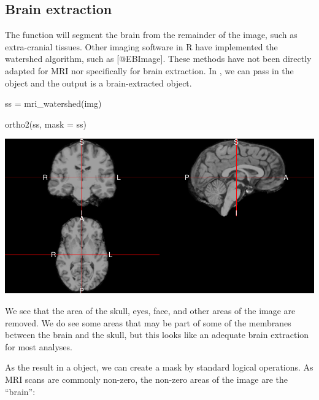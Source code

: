 \subsection{Brain extraction}\label{brain-extraction}

The  function will segment the brain from the
remainder of the image, such as extra-cranial tissues. Other imaging
software in R have implemented the watershed algorithm, such as
 {[}@EBImage{]}. These methods have not been directly
adapted for MRI nor specifically for brain extraction. In
, we can pass in the  object and the output
is a brain-extracted  object.

\begin{Schunk}
\begin{Sinput}
ss = mri_watershed(img)
\end{Sinput}
\end{Schunk}

\begin{Schunk}
\begin{Sinput}
ortho2(ss, mask = ss)
\end{Sinput}
\end{Schunk}\begin{Schunk}

\includegraphics{Freesurfer_files/figure-latex/watershed_plot-1} \end{Schunk}

We see that the area of the skull, eyes, face, and other areas of the
image are removed. We do see some areas that may be part of some of the
membranes between the brain and the skull, but this looks like an
adequate brain extraction for most analyses.

As the result in a  object, we can create a mask by standard
logical operations. As MRI scans are commonly non-zero, the non-zero
areas of the image are the ``brain'':

